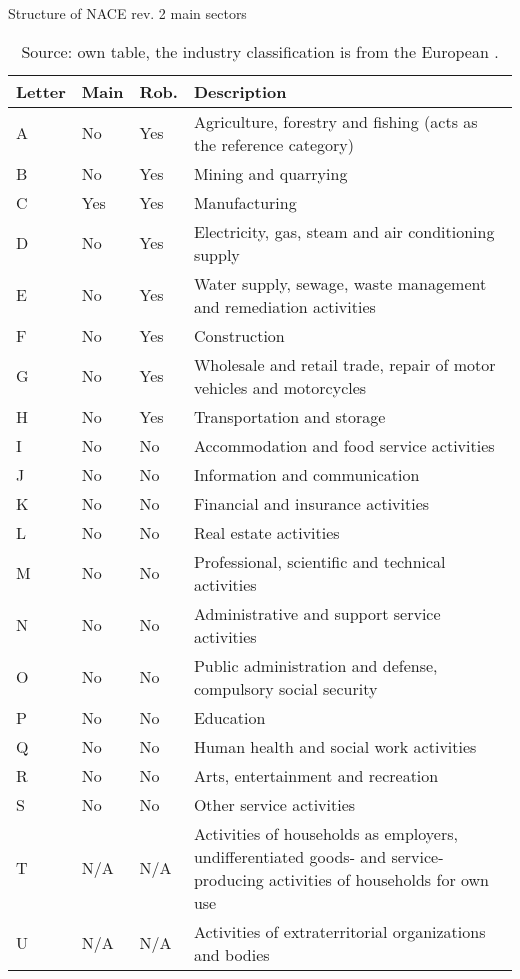 \documentclass[10pt,twocolumn,oneside,cmyk]{article}
\begin{document}
\begin{table}[t]
\scriptsize
 \begin{center}
  \caption{Structure of NACE rev. 2 main sectors}\label{tab16}
   \begin{tabularx}{\linewidth}{l l l X}
   \toprule
   Letter &Main &Rob. &Description\\
   \midrule
   A &No & Yes &Agriculture, forestry and fishing (acts as the reference category)\\
   B &No & Yes &Mining and quarrying\\
   C &Yes & Yes &Manufacturing\\
   D &No & Yes &Electricity, gas, steam and air conditioning supply\\
   E &No & Yes &Water supply, sewage, waste management and remediation activities\\
   F &No & Yes &Construction\\
   G &No & Yes &Wholesale and retail trade, repair of motor vehicles and motorcycles\\
   H &No & Yes &Transportation and storage\\
   I &No & No &Accommodation and food service activities\\
   J &No & No &Information and communication\\
   K &No & No &Financial and insurance activities\\
   L &No & No &Real estate activities\\
   M &No &No &Professional, scientific and technical activities\\
   N &No & No &Administrative and support service activities\\
   O &No & No &Public administration and defense, compulsory social security\\
   P &No & No &Education\\
   Q &No & No &Human health and social work activities\\
   R &No & No &Arts, entertainment and recreation\\
   S &No & No &Other service activities\\
   T &N/A &N/A &Activities of households as employers, undifferentiated goods- and service-producing activities of households for own use\\
   U &N/A & N/A &Activities of extraterritorial organizations and bodies\\
   \bottomrule
   \end{tabularx}
  \caption*{\footnotesize{Source: own table, the industry classification is from the European \textcite[57]{european_commission_nace_2008}.}}
 \end{center}
\end{table}
\end{document}
